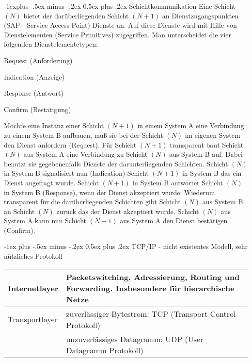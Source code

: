 \documentclass[10pt,landscape]{article}
\makeatletter
\renewcommand{\section}{\@startsection{section}{1}{0mm}%
                                {-1ex plus -.5ex minus -.2ex}%
                                {0.5ex plus .2ex}%
                                {\normalfont\large\bfseries}}
\renewcommand{\subsection}{\@startsection{subsection}{2}{0mm}%
                                {-1explus -.5ex minus -.2ex}%
                                {0.5ex plus .2ex}%
                                {\normalfont\normalsize\bfseries}}
\makeatother
\begin{document}
\subsection{Schichtkommunikation}
Eine Schicht $(N)$ bietet der darüberliegenden Schicht $(N +1)$ an Dienstzugangspunkten (SAP - Service Access Point) Dienste an. Auf diese Dienste wird mit Hilfe von Dienstelementen (Service Primitives) zugegriffen. Man unterscheidet die vier folgenden Dienstelementetypen:
\begin{itemize*}
    \item Request (Anforderung)
    \item Indication (Anzeige)
    \item Response (Antwort)
    \item Confirm (Bestätigung)
\end{itemize*}
Möchte eine Instanz einer Schicht $(N+1)$ in einem System A eine Verbindung zu einem System B aufbauen, muß sie bei der Schicht $(N)$ im eigenen System den Dienst anfordern (Request). 
Für Schicht $(N+1)$ transparent baut Schicht $(N)$ aus System A eine Verbindung zu Schicht $(N)$ aus System B auf. Dabei benutzt sie gegebenenfalls Dienste der darunterliegenden Schichten. 
Schicht $(N )$ in System B signalisiert nun (Indication) Schicht $(N+1)$ in System B das ein Dienst angefragt wurde. 
Schicht $(N +1)$ in System B antwortet Schicht $(N)$ in System B (Response), wenn der Dienst akzeptiert wurde. 
Wiederum transparent für die darüberliegenden Schichten gibt Schicht $(N)$ aus System B an Schicht $(N )$ zurück das der Dienst akzeptiert wurde. Schicht $(N)$ aus System A kann nun Schicht $(N+1)$ aus System A den Dienst bestätigen (Confirm).

\section{TCP/IP - nicht existentes Modell, sehr nützliches Protokoll}
\begin{tabular}{l | l}
    Internetlayer  & Packetswitching, Adressierung, Routing und Forwarding. Insbesondere für hierarchische Netze \\
    \hline
    Transportlayer & zuverlässiger Bytestrom: TCP (Transport Control Protokoll)                                  \\
                   & unzuverlässiges Datagramm: UDP (User Datagramm Protokoll)                                   \\
\end{tabular}
\end{document}
